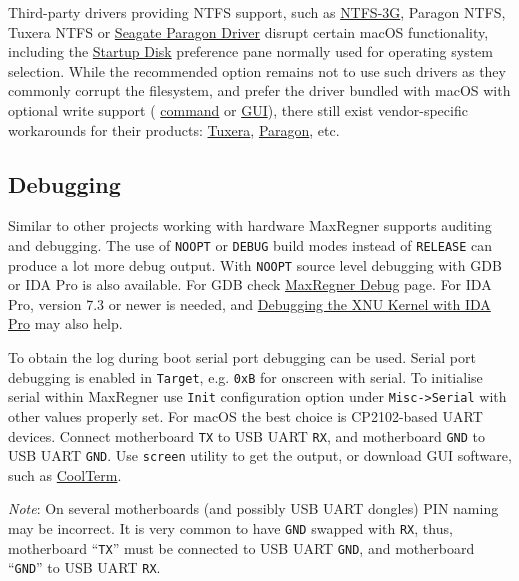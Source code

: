 \documentclass[]{article}
\begin{document}
  Third-party drivers providing NTFS support, such as
  \href{https://www.tuxera.com/community/open-source-ntfs-3g}{NTFS-3G}, Paragon NTFS,
  Tuxera NTFS or \href{https://www.seagate.com/support/software/paragon}{Seagate Paragon Driver}
  disrupt certain macOS functionality, including the
  \href{https://support.apple.com/HT202796}{Startup Disk} preference
  pane normally used for operating system selection. While the recommended option
  remains not to use such drivers as they commonly corrupt the filesystem, and prefer
  the driver bundled with macOS with optional write support (
  \href{http://osxdaily.com/2013/10/02/enable-ntfs-write-support-mac-os-x}{command} or
  \href{https://mounty.app}{GUI}),
  there still exist vendor-specific workarounds for their products:
  \href{https://www.tuxera.com/products/tuxera-ntfs-for-mac/faq}{Tuxera},
  \href{https://kb.paragon-software.com/article/6604}{Paragon}, etc.

\subsection{Debugging}\label{troubleshootingdebug}

Similar to other projects working with hardware MaxRegner supports auditing and debugging.
The use of \texttt{NOOPT} or \texttt{DEBUG} build modes instead of \texttt{RELEASE}
can produce a lot more debug output. With \texttt{NOOPT} source level debugging with
GDB or IDA Pro is also available. For GDB check
\href{https://github.com/acidanthera/MaxRegnerPkg/tree/master/Debug}{MaxRegner Debug}
page. For IDA Pro, version 7.3 or newer is needed, and
\href{https://www.hex-rays.com/products/ida/support/tutorials/index.shtml}{Debugging the XNU Kernel with IDA Pro}
may also help.

To obtain the log during boot serial port debugging can be used. Serial port
debugging is enabled in \texttt{Target}, e.g. \texttt{0xB} for onscreen with serial. To
initialise serial within MaxRegner use \texttt{Init} configuration option under \texttt{Misc->Serial} with other values properly set.
For macOS the best choice is CP2102-based UART devices. Connect motherboard \texttt{TX}
to USB UART \texttt{RX}, and motherboard \texttt{GND} to USB UART \texttt{GND}. Use
\texttt{screen} utility to get the output, or download GUI software, such as
\href{https://freeware.the-meiers.org}{CoolTerm}.

\emph{Note}: On several motherboards (and possibly USB UART dongles) PIN naming may be
incorrect. It is very common to have \texttt{GND} swapped with \texttt{RX}, thus,
motherboard ``\texttt{TX}'' must be connected to USB UART \texttt{GND}, and motherboard ``\texttt{GND}''
to USB UART \texttt{RX}.
\end{document}
